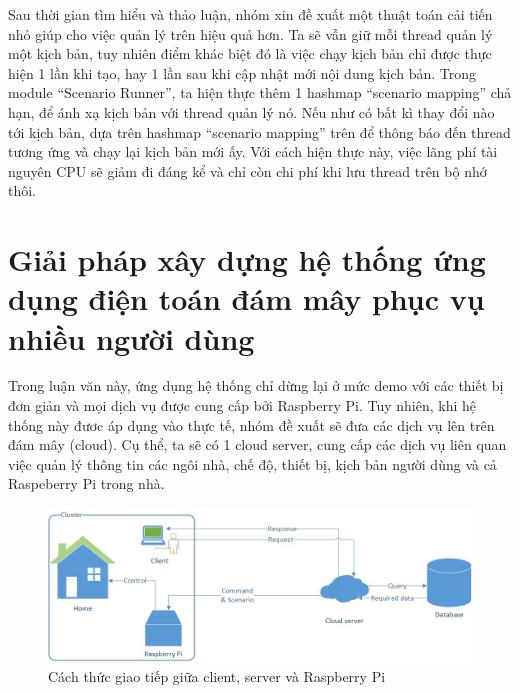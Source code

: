 \documentclass[12pt,a4paper,oneside]{extbook}
\begin{document}
\noindent
Sau thời gian tìm hiểu và thảo luận, nhóm xin đề xuất một thuật toán cải tiến nhỏ giúp cho việc quản lý trên hiệu quả hơn. Ta sẽ vẫn giữ mỗi thread quản lý một kịch bản, tuy nhiên điểm khác biệt đó là việc chạy kịch bản chỉ được thực hiện 1 lần khi tạo, hay 1 lần sau khi cập nhật mới nội dung kịch bản. Trong module “Scenario Runner”, ta hiện thực thêm 1 hashmap “scenario mapping” chả hạn, để ánh xạ kịch bản với thread quản lý nó. Nếu như có bất kì thay đổi nào tới kịch bản, dựa trên hashmap “scenario mapping” trên để thông báo đến thread tương ứng và chạy lại kịch bản mới ấy. Với cách hiện thực này, việc lãng phí tài nguyên CPU sẽ giảm đi đáng kể và chỉ còn chi phí khi lưu thread trên bộ nhớ thôi.

\section{Giải pháp xây dựng hệ thống ứng dụng điện toán đám mây phục vụ nhiều người dùng}

Trong luận văn này, ứng dụng hệ thống chỉ dừng lại ở mức demo với các thiết bị đơn giản và mọi dịch vụ được cung cấp bởi Raspberry Pi. Tuy nhiên, khi hệ thống này đươc áp dụng vào thực tế, nhóm đề xuất sẽ đưa các dịch vụ lên trên đám mây (cloud). Cụ thể, ta sẽ có 1 cloud server, cung cấp các dịch vụ liên quan việc quản lý thông tin các ngôi nhà, chế độ, thiết bị, kịch bản người dùng và cả Raspeberry Pi trong nhà.\\

\begin{figure}[h]
  \centering
     \includegraphics[width=15cm]{6-Communicate-among-client-server-and-Pi}
  \caption{Cách thức giao tiếp giữa client, server và Raspberry Pi}\label{fig:6-Communicate-among-client-server-and-Pi}
\end{figure}
\end{document}
